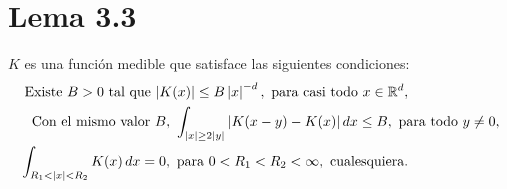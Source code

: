 \documentclass{myarticle}
\newcommand{\abs}[1]{\left|{#1}\right|}
\newcommand{\abss}[1]{\vert #1 \vert}
\newcommand{\reales}{\mathbb{R}}
\begin{document}
\section{Lema 3.3}

$K$ es una función medible que satisface las siguientes condiciones:
\begin{align}
    \text{ Existe }B>0\text{ tal que }\abss{K(x)}\leq B\abs{x}^{-d},\text{ para casi todo }x\in\reales^d,\hspace{2.3cm}\label{lem33.1}\\
    \text{ Con el mismo valor }B,\,\, \int_{\abs{x}\geq 2\abs{y}}\abss{K(x-y)-K(x)}\, dx\leq B,\text{ para todo }y\neq 0,\label{lem33.2}\\
    \int_{R_1<\abs{x}<R_2}K(x)\, dx=0, \text{ para }0<R_1<R_2<\infty,\text{ cualesquiera.}\hspace{2.3cm}\label{lem33.3} 
\end{align}
\end{document}

